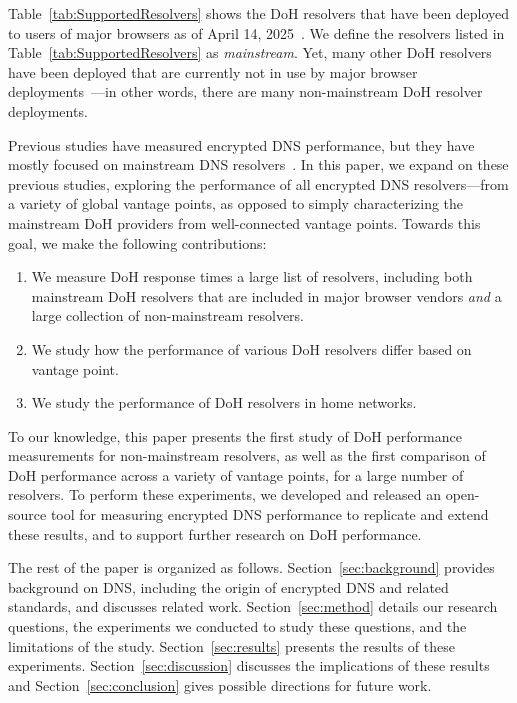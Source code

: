 Table~\ref{tab:SupportedResolvers} shows the DoH resolvers that have been deployed
to users of major browsers as of April 14,
2025~\cite{bravebrowser,edgebrowser,ffbrowser,chromebrowser,operabrowser}.  We
define the resolvers listed in Table~\ref{tab:SupportedResolvers} as {\em
mainstream}.
Yet, many other DoH resolvers have been deployed that are currently
not in use by major browser deployments~\cite{dnscrypt}---in other words,
there are many non-mainstream DoH resolver deployments.  

Previous studies have measured encrypted DNS performance, but they have mostly focused on mainstream DNS resolvers~\cite{hounsel2020comparing,hounsel2021can,hoang2020k,lu2019end-to-end}.
In this paper, we expand on these previous studies, exploring the performance
of all encrypted DNS resolvers---from a variety of global 
vantage points, as opposed to simply characterizing the mainstream DoH
providers from well-connected vantage points.
Towards this goal, we make the following contributions:
\begin{enumerate}
    \itemsep=-1pt
    \item We measure DoH response times a large list of resolvers, including
        both mainstream DoH resolvers that are included in major browser
        vendors {\em and} a large collection of non-mainstream resolvers.
    \item We study how the performance of various DoH resolvers differ based
        on vantage point.
    \item We study the performance of DoH resolvers in home networks. 
\end{enumerate}
\noindent
To our knowledge, this paper presents the first study of DoH performance
measurements for non-mainstream resolvers, as well as the first comparison of
DoH performance across a variety of vantage points, for a large number of
resolvers.
To perform these experiments, we developed and released an open-source
tool for measuring encrypted DNS performance to replicate and extend these
results, and to support further research on DoH performance.

The rest of the paper is organized as follows.  Section~\ref{sec:background}
provides background on DNS, including the origin of encrypted DNS and related
standards, and discusses related work.  Section~\ref{sec:method} details our research questions, the
experiments we conducted to study these questions, and the limitations of the
study.  Section~\ref{sec:results} presents the results of these experiments.
Section~\ref{sec:discussion} discusses the implications
of these results and Section~\ref{sec:conclusion} gives possible directions for future work. 

